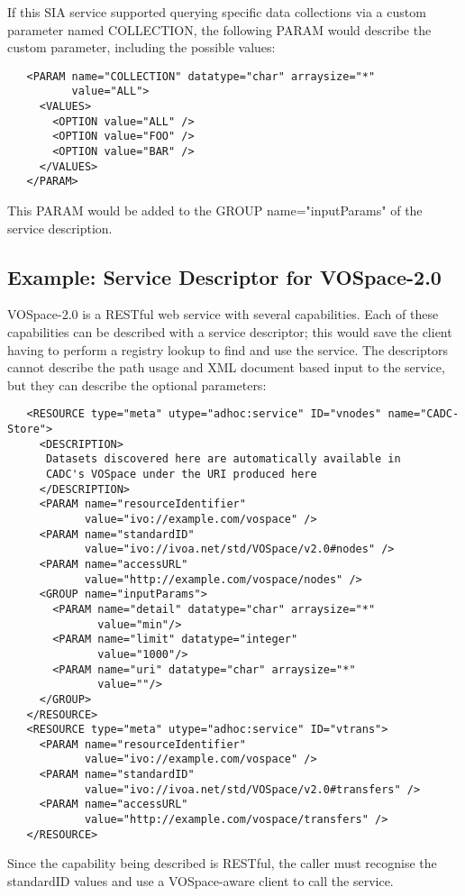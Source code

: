 \documentclass[11pt,a4paper]{ivoa}
\newcommand{\attval}[2]{#1={\allowbreak}{"}#2{"}}
\begin{document}
If this SIA service supported querying specific data collections via
a custom parameter named COLLECTION, the following PARAM would describe the
custom parameter, including the possible values:
\begin{verbatim}
   <PARAM name="COLLECTION" datatype="char" arraysize="*"
          value="ALL">
     <VALUES>
       <OPTION value="ALL" />
       <OPTION value="FOO" />
       <OPTION value="BAR" />
     </VALUES>
   </PARAM>
\end{verbatim}
This PARAM would be added to the GROUP \attval{name}{inputParams}
of the service description.


\subsection{Example: Service Descriptor for VOSpace-2.0}

VOSpace-2.0 is a RESTful web service with several capabilities. Each of
these capabilities can be described with a service descriptor; this would
save the client having to perform a registry lookup to find and use the
service. The descriptors cannot describe the path usage and XML document
based input to the service, but they can describe the optional parameters:
\begin{verbatim}
   <RESOURCE type="meta" utype="adhoc:service" ID="vnodes" name="CADC-Store">
     <DESCRIPTION>
      Datasets discovered here are automatically available in 
      CADC's VOSpace under the URI produced here
     </DESCRIPTION>
     <PARAM name="resourceIdentifier"
            value="ivo://example.com/vospace" />
     <PARAM name="standardID"
            value="ivo://ivoa.net/std/VOSpace/v2.0#nodes" />
     <PARAM name="accessURL"
            value="http://example.com/vospace/nodes" />
     <GROUP name="inputParams">
       <PARAM name="detail" datatype="char" arraysize="*"
              value="min"/>
       <PARAM name="limit" datatype="integer"
              value="1000"/>
       <PARAM name="uri" datatype="char" arraysize="*"
              value=""/>
     </GROUP>
   </RESOURCE>
   <RESOURCE type="meta" utype="adhoc:service" ID="vtrans">
     <PARAM name="resourceIdentifier"
            value="ivo://example.com/vospace" />
     <PARAM name="standardID"
            value="ivo://ivoa.net/std/VOSpace/v2.0#transfers" />
     <PARAM name="accessURL"
            value="http://example.com/vospace/transfers" />
   </RESOURCE>
\end{verbatim}
Since the capability being described is RESTful, the
caller must recognise the standardID values and use a VOSpace-aware
client to call the service.
\end{document}
